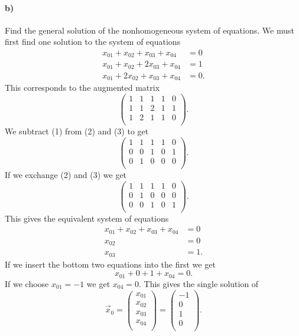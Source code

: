 \paragraph{b)} Find the general solution of the nonhomogeneous system of equations.
\bigbreak
We must first find one solution to the system of equations
\begin{align*}
  x_{01} + x_{02} + x_{03} + x_{04} &= 0 \\
  x_{01} + x_{02} + 2x_{03} + x_{04} &= 1 \\
  x_{01} + 2x_{02} + x_{03} + x_{04} &= 0
.\end{align*}
This corresponds to the augmented matrix
\[ 
\left( \begin{array}{cccc|c}
1 & 1 & 1 & 1 & 0\\
1 & 1 & 2 & 1 & 1\\
1 & 2 & 1 & 1 & 0\\
\end{array} \right)
.\]
We subtract (1) from (2) and (3) to get
\[ 
\left( \begin{array}{cccc|c}
1 & 1 & 1 & 1 & 0\\
0 & 0 & 1 & 0 & 1\\
0 & 1 & 0 & 0 & 0\\
\end{array} \right)
.\]
If we exchange (2) and (3) we get
\[ 
\left( \begin{array}{cccc|c}
1 & 1 & 1 & 1 & 0\\
0 & 1 & 0 & 0 & 0\\
0 & 0 & 1 & 0 & 1\\
\end{array} \right)
.\]
This gives the equivalent system of equations
\begin{align*}
  x_{01} + x_{02} + x_{03} + x_{04} &= 0 \\
  x_{02} &= 0 \\
  x_{03} &= 1
.\end{align*}
If we insert the bottom two equations into the first we get
\[ 
x_{01} + 0 + 1 + x_{04} = 0
.\]
If we choose $x_{01} = -1$ we get $x_{04} = 0$. This gives the single solution of
\[ 
\Vec{x}_0 = \begin{pmatrix}
x_{01}\\
x_{02}\\
x_{03}\\
x_{04}\\
\end{pmatrix} = \begin{pmatrix}
-1\\
0\\
1\\
0\\
\end{pmatrix}
.\]
